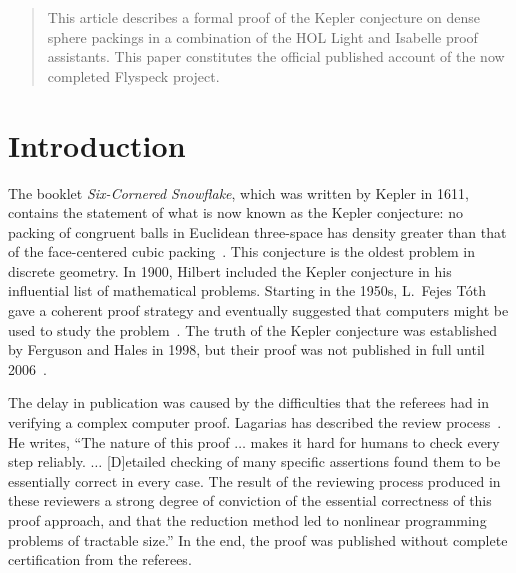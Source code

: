 \newcommand{\R}{\mathbb{R}}
\newcommand{\IR}{\mathbb{IR}}
\newcommand{\Arctan}{\mathop{\rm Arctan}}
\newcommand{\abss}[1]{\lvert#1\rvert}
\newcommand{\iabs}{\mathop{\rm iabs}}
\newcommand{\bx}{{\bf x}}
\newcommand{\GT}{G_{\hbox{\tiny Taylor}}}




\begin{abstract}
  This article describes a formal proof of the Kepler conjecture on
  dense sphere packings in a combination of the HOL Light and Isabelle
  proof assistants.  This paper constitutes the official published
  account of the now completed Flyspeck project.
\end{abstract}

\maketitle

\section{Introduction}


The booklet {\it Six-Cornered Snowflake}, which was written by Kepler
in 1611, contains the statement of what is now known as the Kepler
conjecture: no packing of congruent balls in Euclidean three-space has
density greater than that of the face-centered cubic
packing~\cite{Kep66}.  This conjecture is the oldest problem in
discrete geometry.  In 1900, Hilbert included the Kepler conjecture in
his influential list of mathematical problems.  Starting in the 1950s,
L.\ Fejes T\'oth gave a coherent proof strategy and eventually
suggested that computers might be used to study the
problem~\cite{Fej53}.  The truth of the Kepler conjecture was
established by Ferguson and Hales in 1998, but their proof was not
published in full until 2006~\cite{Hales:2006:DCG}.

The delay in publication was caused by the difficulties that the
referees had in verifying a complex computer proof.  Lagarias has
described the review process~\cite{LagKC}.  He writes, ``The nature of
this proof $\ldots$ makes it hard for humans to check every step
reliably. $\ldots$ [D]etailed checking of many specific assertions
found them to be essentially correct in every case.  The result of the
reviewing process produced in these reviewers a strong degree of
conviction of the essential correctness of this proof approach, and
that the reduction method led to nonlinear programming problems of
tractable size.''  In the end, the proof was published without
complete certification from the referees.

